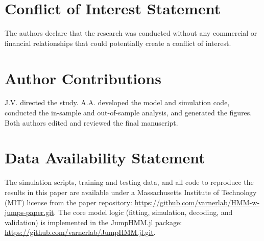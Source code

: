 \section*{Conflict of Interest Statement}
The authors declare that the research was conducted without any commercial or financial relationships that could potentially create a conflict of interest.

\section*{Author Contributions}
J.V. directed the study. A.A. developed the model and simulation code, conducted the in-sample and out-of-sample analysis, and generated the figures. Both authors edited and reviewed the final manuscript.

\section*{Data Availability Statement}
The simulation scripts, training and testing data, and all code to reproduce the results in this paper are available under a Massachusetts Institute of Technology (MIT) license from the paper repository: \url{https://github.com/varnerlab/HMM-w-jumps-paper.git}. The core model logic (fitting, simulation, decoding, and validation) is implemented in the JumpHMM.jl package: \url{https://github.com/varnerlab/JumpHMM.jl.git}.
